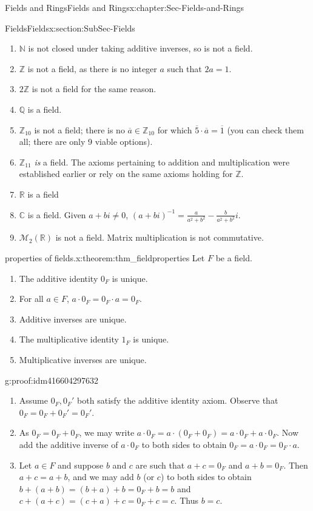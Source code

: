 \documentclass[oneside,10pt,]{book}
\numberwithin{equation}{section}
\def\C{{\mathbb C}}
\def\Z{{\mathbb Z}}
\def\Q{{\mathbb Q}}
\def\N{{\mathbb N}}
\def\R{{\mathbb R}}
\begin{document}
\begin{chapterptx}{Fields and Rings}{}{Fields and Rings}{}{}{x:chapter:Sec-Fields-and-Rings}
\begin{sectionptx}{Fields}{}{Fields}{}{}{x:section:SubSec-Fields}
\begin{enumerate}
\item{}\(\N\) is not closed under taking additive inverses, so is not a field.%
\item{}\(\Z\) is not a field, as there is no integer \(a\) such that \(2a = 1\).%
\item{}\(2\Z\) is not a field for the same reason.%
\item{}\(\Q\) is a field.%
\item{}\(\Z_{10}\) is not a field; there is no \(\overline{a}\in \Z_{10}\) for which \(\overline{5}\cdot \overline{a} = \overline{1}\) (you can check them all; there are only 9 viable options).%
\item{}\(\Z_{11}\) \emph{is} a field. The axioms pertaining to addition and multiplication were established earlier or rely on the same axioms holding for \(\Z\).%
\item{}\(\R\) is a field%
\item{}\(\C\) is a field. Given \(a+bi\ne 0\), \((a+bi)^{-1} = \frac{a}{a^2 + b^2} - \frac{b}{a^2 + b^2} i\).%
\item{}\(\mathcal{M}_2(\R)\) is not a field. Matrix multiplication is not commutative.%
\end{enumerate}
%
\begin{theorem}{properties of fields.}{}{x:theorem:thm_fieldproperties}%
Let \(F\) be a field.%
\begin{enumerate}
\item{}The additive identity \(0_F\) is unique.%
\item{}For all \(a\in F\), \(a \cdot 0_F = 0_F\cdot a = 0_F\).%
\item{}Additive inverses are unique.%
\item{}The multiplicative identity \(1_F\) is unique.%
\item{}Multiplicative inverses are unique.%
\end{enumerate}
%
\end{theorem}
\begin{proofptx}{}{g:proof:idm416604297632}
%
\begin{enumerate}
\item{}Assume \(0_F, 0_F'\) both satisfy the additive identity axiom. Observe that \(0_F = 0_F + 0_F' = 0_F'\).%
\item{}As \(0_F = 0_F + 0_F\), we may write \(a\cdot 0_F = a\cdot (0_F + 0_F) = a\cdot 0_F + a \cdot 0_F\). Now add the additive inverse of \(a\cdot 0_F\) to both sides to obtain \(0_F = a \cdot 0_F = 0_F\cdot a\).%
\item{}Let \(a\in F\) and suppose \(b\) and \(c\) are such that \(a+c = 0_F\) and \(a+b = 0_F\). Then \(a+c = a+b\), and we may add \(b\) (or \(c\)) to both sides to obtain \(b+(a+b) = (b+a)+b = 0_F + b = b\) and \(c+(a+c) = (c+a)+c = 0_F + c = c\). Thus \(b=c\).%

\end{enumerate}
\end{proofptx}
\end{sectionptx}
\end{chapterptx}
\end{document}
